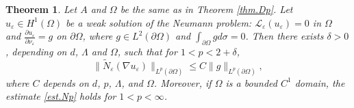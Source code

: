 \documentclass[reqno,12pt]{amsart} %
\newtheorem{theorem}{Theorem}[section]
\theoremstyle{definition}
\theoremstyle{remark}
\numberwithin{equation}{section}
\newcommand{\cL}{\mathcal{L}}
\newcommand{\e}{\varepsilon}
\begin{document}
\begin{theorem}\label{thm.Np}
Let $A$ and $\Omega$ be the same as in Theorem \ref{thm.Dp}.
     Let $u_\e\in H^1(\Omega)$ be a weak solution of 
    the Neumann problem: $\cL_\e (u_\e)=0$ in $\Omega$
    and $\frac{\partial u_\e}{\partial \nu_\e} =g$ on $\partial\Omega$,
    where $g\in L^2(\partial\Omega)$ and
    $\int_{\partial\Omega} gd\sigma =0$. Then there exists $\delta>0$, depending on $d$,  $\Lambda$ and $\Omega$, such that for $1<p<2+\delta$, 
    \begin{equation}\label{est.Np}
        \| \widetilde{N}_\e( \nabla u_\e) \|_{L^p(\partial \Omega)} \le C  \| g \|_{L^p(\partial \Omega)},
    \end{equation}
    where $C$ depends on $d$, $p$, $\Lambda$, and $\Omega$.
    Moreover, if $\Omega$ is a bounded $C^1$ domain,
    the estimate \eqref{est.Np} holds for $1< p< \infty$.
\end{theorem}






\end{document}
